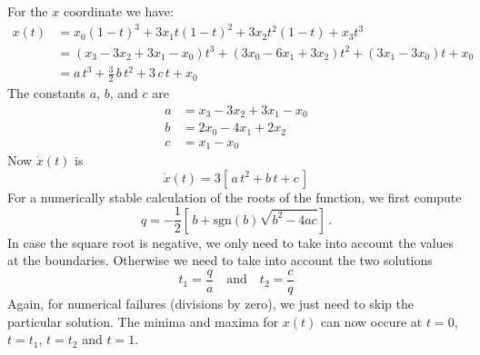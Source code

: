 \documentclass{article}
\begin{document}
For the $x$ coordinate we have:
\begin{align}
  x(t) & = x_0(1-t)^3 + 3x_1t(1-t)^2 + 3x_2t^2(1-t) + x_3 t^3\\
       & = (x_3-3x_2+3x_1-x_0)t^3 + (3x_0-6x_1+3x_2)t^2 + (3x_1-3x_0)t + x_0\\
       & = a\,t^3 + \frac{3}{2}\,b\,t^2 + 3\,c\,t + x_0
\end{align}
%
The constants $a$, $b$, and $c$ are
%
\begin{align}
  a & = x_3-3x_2+3x_1-x_0 \\
  b & = 2x_0-4x_1+2x_2 \\
  c & = x_1-x_0
\end{align}
%
Now $\dot x(t)$ is
%
\begin{equation}
  \dot x(t) = 3\left[\,a\,t^2 + b\,t + c\,\right]
\end{equation}
%
For a numerically stable calculation of the roots of the function, we
first compute
%
\begin{equation}
  q = -\frac{1}{2}\left[\,b+\mathrm{sgn}(b)\sqrt{b^2-4ac}\right]\, .
\end{equation}
%
In case the square root is negative, we only need to take into account
the values at the boundaries. Otherwise we need to take into account
the two solutions
%
\begin{equation}
  t_1 = \frac{q}{a} \quad\text{and}\quad t_2 = \frac{c}{q}
\end{equation}
%
Again, for numerical failures (divisions by zero), we just need to skip
the particular solution. The minima and maxima for $x(t)$ can now
occure at $t=0$, $t=t_1$, $t=t_2$ and $t=1$.
\end{document}
